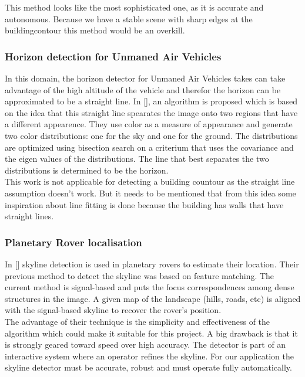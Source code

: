 This method looks like the most sophisticated one, as it is accurate and autonomous. Because we have a stable scene with sharp edges at the buildingcontour this method would be an overkill.


\subsubsection{Horizon detection for Unmaned Air Vehicles}
In this domain, the horizon detector for Unmaned Air Vehicles takes can take advantage of the high
altitude of the vehicle and therefor the horizon can be approximated to be a
straight line. 
In [], %
an algorithm is proposed which is based on the idea that this straight line spearates the image
onto two regions that have a different appearence. They use color as a measure
of appearance and generate two color distributions: one for the sky and one
for the ground. The distributions are optimized using bisection search on a criterium that uses the covariance and the eigen values of the distributions. The line that best separates the two distributions is determined to be the horizon.\\
This work is not applicable for detecting a building countour as the
straight line assumption doesn't work. But it needs to be mentioned that from this
idea some inspiration about line fitting is done because the building has walls
that have straight lines.


\subsubsection{Planetary Rover localisation}
In [] %
skyline detection is used in planetary rovers to estimate their location.
Their previous method to detect the skyline was based on feature matching. The current method is signal-based and puts the focus correspondences among dense structures in the image. 
A given map of the landscape (hills, roads, etc) is aligned with the signal-based skyline to recover the rover's position.\\

The advantage of their technique is the simplicity and effectiveness of the
algorithm which could make it suitable for this project.  A big drawback is
that it is strongly geared toward speed over high accuracy. The detector is
part of an interactive system where an operator refines the skyline.  For our
application the skyline detector must be accurate, robust and must operate
fully automatically.\\

